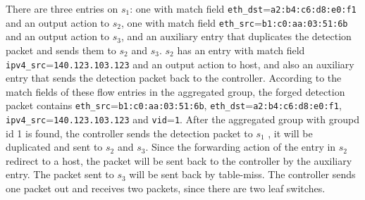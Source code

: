 There are three entries on $s_1$: one with match field \texttt{eth\_dst}=\texttt{a2:b4:c6:d8:e0:f1} and an output action to $s_2$, one with match field \texttt{eth\_src}=\texttt{b1:c0:aa:03:51:6b} and an output action to $s_3$, and an auxiliary entry that duplicates the detection packet and sends them to $s_2$ and $s_3$. $s_2$ has an entry with match field \texttt{ipv4\_src}=\texttt{140.123.103.123} and an output action to host, and also an auxiliary entry that sends the detection packet back to the controller. According to the match fields of these flow entries in the aggregated group, the forged detection packet contains \texttt{eth\_src}=\texttt{b1:c0:aa:03:51:6b}, \texttt{eth\_dst}=\texttt{a2:b4:c6:d8:e0:f1}, \texttt{ipv4\_src}=\texttt{140.123.103.123} and \texttt{vid}=\texttt{1}. After the aggregated group with groupd id 1 is found\sout{}, the controller sends the detection packet to $s_1$ \sout{}, it will be duplicated and sent to $s_2$ and $s_3$. Since the forwarding action of the entry in $s_2$ redirect \sout{} to a host, the packet will be sent back to the controller by the auxiliary entry. The packet sent to $s_3$ will be sent back by table-miss. The controller sends one packet out and receives two packets, since there are two leaf switches.

